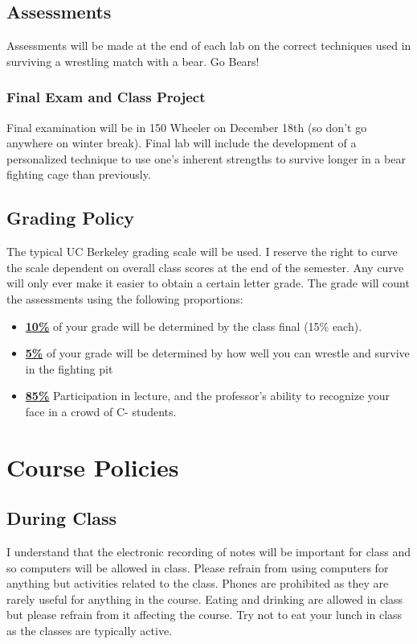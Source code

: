 \documentclass[11pt]{article}
\begin{document}
\subsection*{Assessments}

Assessments will be made at the end of each lab on the correct techniques used in surviving a wrestling match with a bear. Go Bears!

\subsubsection*{Final Exam and Class Project}

Final examination will be in 150 Wheeler on December 18th (so don't go anywhere on winter break). Final lab will include the development of a personalized technique to use one's inherent strengths to survive longer in a bear fighting cage than previously. 

\subsection*{Grading Policy}
The typical UC Berkeley grading scale will be used. I reserve the right to curve the scale dependent on overall class scores at the end of the semester. Any curve will only ever make it easier to obtain a certain letter grade. The grade will count the assessments using the following proportions:
\begin{itemize}
	\item \underline{\textbf{10\%}} of your grade will be determined by the class final (15\% each).
	\item \underline{\textbf{5\%}} of your grade will be determined by how well you can wrestle and survive in the fighting pit
	\item \underline{\textbf{85\%}} Participation in lecture, and the professor's ability to recognize your face in a crowd of C- students. 
\end{itemize}

\section*{Course Policies}

\subsection*{During Class}
\footnotesize{I understand that the electronic recording of notes will be important for class and so computers will be allowed in class. Please refrain from using computers for anything but activities related to the class. Phones are prohibited as they are rarely useful for anything in the course. Eating and drinking are allowed in class but please refrain from it affecting the course. Try not to eat your lunch in class as the classes are typically active.}
\end{document}
